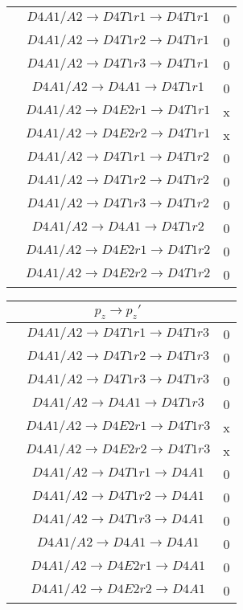 \documentclass[10pt]{article}
\begin{document}
\begin{enumerate}
\begin{table}[!htbp]
\begin{minipage}{0.33\textwidth}
\begin{tabular}{cc c}
&$ D4A1/A2 \rightarrow D4T1 r1 \rightarrow D4T1 r1 $& 0\\
&$ D4A1/A2 \rightarrow D4T1 r2 \rightarrow D4T1 r1 $& 0\\
&$ D4A1/A2 \rightarrow D4T1 r3 \rightarrow D4T1 r1 $& 0\\
&$ D4A1/A2 \rightarrow D4A1 \rightarrow D4T1 r1 $& 0\\
&$ D4A1/A2 \rightarrow D4E2 r1 \rightarrow D4T1 r1 $& x\\
&$ D4A1/A2 \rightarrow D4E2 r2 \rightarrow D4T1 r1 $& x\\ \hline
&$ D4A1/A2 \rightarrow D4T1 r1 \rightarrow D4T1 r2 $& 0\\
&$ D4A1/A2 \rightarrow D4T1 r2 \rightarrow D4T1 r2 $& 0\\
&$ D4A1/A2 \rightarrow D4T1 r3 \rightarrow D4T1 r2 $& 0\\
&$ D4A1/A2 \rightarrow D4A1 \rightarrow D4T1 r2 $& 0\\
&$ D4A1/A2 \rightarrow D4E2 r1 \rightarrow D4T1 r2 $& 0\\
&$ D4A1/A2 \rightarrow D4E2 r2 \rightarrow D4T1 r2 $& 0\\ \hline

\end{tabular}
\end{minipage}
\begin{minipage}[!htbp]{0.33\textwidth}
\centering
\begin{tabular}{ccc}
&$p_z \rightarrow p_z' $&\\ \hline

&$ D4A1/A2 \rightarrow D4T1 r1 \rightarrow D4T1 r3 $& 0\\
&$ D4A1/A2 \rightarrow D4T1 r2 \rightarrow D4T1 r3 $& 0\\
&$ D4A1/A2 \rightarrow D4T1 r3 \rightarrow D4T1 r3 $& 0\\
&$ D4A1/A2 \rightarrow D4A1 \rightarrow D4T1 r3 $& 0\\
&$ D4A1/A2 \rightarrow D4E2 r1 \rightarrow D4T1 r3 $& x\\
&$ D4A1/A2 \rightarrow D4E2 r2 \rightarrow D4T1 r3 $& x\\ \hline
&$ D4A1/A2 \rightarrow D4T1 r1 \rightarrow D4A1 $& 0\\
&$ D4A1/A2 \rightarrow D4T1 r2 \rightarrow D4A1 $& 0\\
&$ D4A1/A2 \rightarrow D4T1 r3 \rightarrow D4A1 $& 0\\
&$ D4A1/A2 \rightarrow D4A1 \rightarrow D4A1 $& 0\\
&$ D4A1/A2 \rightarrow D4E2 r1 \rightarrow D4A1 $& 0\\
&$ D4A1/A2 \rightarrow D4E2 r2 \rightarrow D4A1 $& 0\\ \hline


\end{tabular}
\end{minipage}
\end{table}
\end{enumerate}
\end{document}
